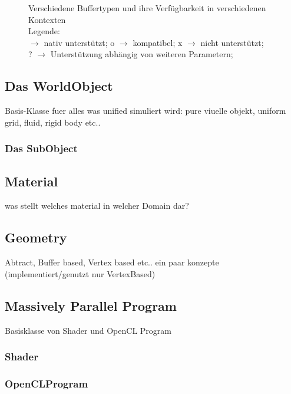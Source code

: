\begin{figure}[!h]
\begin{tabular}
    	\noalign{\hrule}
     
     	
  		\end{tabular}	
  	
  		\caption{		
  			Verschiedene Buffertypen und ihre Verfügbarkeit in verschiedenen Kontexten \\	
  			Legende: \\
			{\color{green}\checkmark}	$\rightarrow$ nativ unterstützt;
			{\color{orange}o}	$\rightarrow$ kompatibel;
			{\color{red}x}	$\rightarrow$ nicht unterstützt;	\\
			{\color{orange}?}	$\rightarrow$ Unterstützung abhängig von weiteren Parametern;	
		}
	
  	\end{figure}
 
\subsection{Das WorldObject}
	Basis-Klasse fuer alles was unified simuliert wird: pure viuelle objekt, uniform grid, fluid, rigid body etc..
	
	\subsubsection{Das SubObject}
  
 
\subsection{Material}  
	was stellt welches material in welcher Domain dar?
	
\subsection{Geometry}
	Abtract, Buffer based, Vertex based etc.. ein paar konzepte (implementiert/genutzt nur VertexBased)  
	
\subsection{Massively Parallel Program}
	Basisklasse von Shader und OpenCL Program
	\subsubsection{Shader}
		
	\subsubsection{OpenCLProgram}

